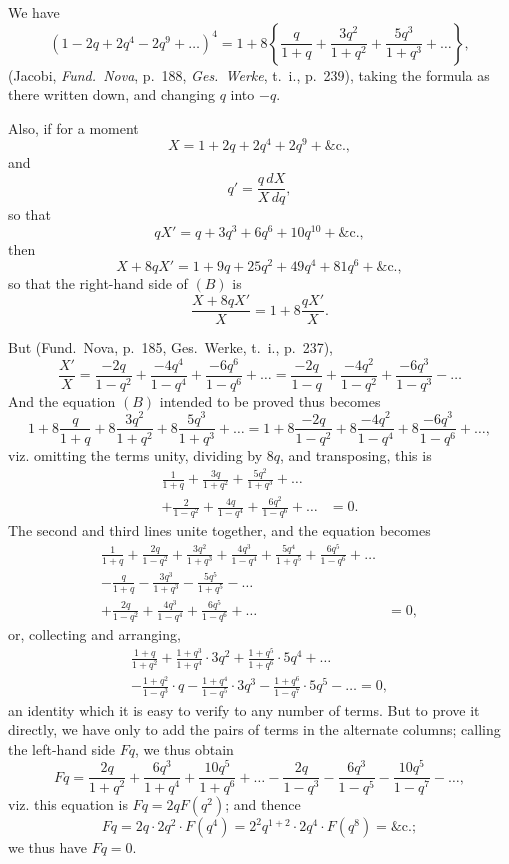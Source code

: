 \documentclass[11pt,a4paper]{book}
\begin{document}
We have
\[
(1-2q+2q^4-2q^9+\ldots)^4 = 1 + 8\left\{\frac{q}{1+q} + \frac{3q^2}{1+q^2} + \frac{5q^3}{1+q^3} + \ldots\right\},
\]
(Jacobi, \textit{Fund.~Nova}, p.~188, \textit{Ges.~Werke}, t.~i., p.~239), taking the formula as there written down, and changing $q$ into $-q$.

Also, if for a moment
\[
X = 1 + 2q + 2q^4 + 2q^9 + \&\text{c.},
\]
and
\[
q' = \frac{q\, dX}{X\, dq},
\]
so that
\[
qX' = q + 3q^3 + 6q^6 + 10q^{10} + \&\text{c.},
\]
then
\[
X + 8qX' = 1 + 9q + 25q^2 + 49q^4 + 81q^6 + \&\text{c.},
\]
so that the right-hand side of $(B)$ is
\[
\frac{X + 8qX'}{X} = 1 + 8\frac{qX'}{X}.
\]

But (Fund.~Nova, p.~185, Ges.~Werke, t.~i., p.~237),
\[
\frac{X'}{X} = \frac{-2q}{1-q^2} + \frac{-4q^4}{1-q^4} + \frac{-6q^6}{1-q^6} + \ldots = \frac{-2q}{1-q} + \frac{-4q^2}{1-q^2} + \frac{-6q^3}{1-q^3} - \ldots
\]
And the equation $(B)$ intended to be proved thus becomes
\[
1 + 8\frac{q}{1+q} + 8\frac{3q^2}{1+q^2} + 8\frac{5q^3}{1+q^3} + \ldots = 1 + 8\frac{-2q}{1-q^2} + 8\frac{-4q^2}{1-q^4} + 8\frac{-6q^3}{1-q^6} + \ldots,
\]
viz. omitting the terms unity, dividing by $8q$, and transposing, this is
\begin{align*}
\frac{1}{1+q} + \frac{3q}{1+q^2} + \frac{5q^2}{1+q^3} + \ldots \\
+ \frac{2}{1-q^2} + \frac{4q}{1-q^4} + \frac{6q^2}{1-q^6} + \ldots &= 0.
\end{align*}
The second and third lines unite together, and the equation becomes
\begin{align*}
\frac{1}{1+q} + \frac{2q}{1-q^2} + \frac{3q^2}{1+q^3} + \frac{4q^3}{1-q^4} + \frac{5q^4}{1+q^5} + \frac{6q^5}{1-q^6} + \ldots \\
- \frac{q}{1+q} - \frac{3q^3}{1+q^3} - \frac{5q^5}{1+q^5} - \ldots \\
+ \frac{2q}{1-q^2} + \frac{4q^3}{1-q^4} + \frac{6q^5}{1-q^6} + \ldots &= 0,
\end{align*}
or, collecting and arranging,
\begin{multline*}
\frac{1+q}{1+q^2} + \frac{1+q^3}{1+q^4} \cdot 3q^2 + \frac{1+q^5}{1+q^6} \cdot 5q^4 + \ldots \\
- \frac{1+q^2}{1-q^3} \cdot q - \frac{1+q^4}{1-q^5} \cdot 3q^3 - \frac{1+q^6}{1-q^7} \cdot 5q^5 - \ldots = 0,
\end{multline*}
an identity which it is easy to verify to any number of terms. But to prove it directly, we have only to add the pairs of terms in the alternate columns; calling the left-hand side $Fq$, we thus obtain
\[
Fq = \frac{2q}{1+q^2} + \frac{6q^3}{1+q^4} + \frac{10q^5}{1+q^6} + \ldots - \frac{2q}{1-q^3} - \frac{6q^3}{1-q^5} - \frac{10q^5}{1-q^7} - \ldots,
\]
viz. this equation is $Fq = 2qF(q^2)$; and thence
\[
Fq = 2q \cdot 2q^2 \cdot F(q^4) = 2^2 q^{1+2} \cdot 2q^4 \cdot F(q^8) = \&\text{c.};
\]
we thus have $Fq = 0$.
\end{document}
